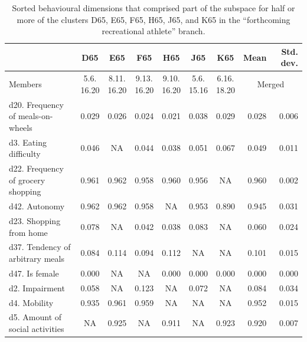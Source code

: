 \begin{table}[ht]
\centering\scriptsize
\setlength\tabcolsep{2pt} %
\renewcommand{\arraystretch}{1.0} %
\caption{Sorted behavioural dimensions that comprised part of the subspace for half or more of the clusters  D65, E65, F65, H65, J65, and K65 in the ``forthcoming recreational athlete'' branch.}
\label{tab:extractathlete}%
\begin{tabular}{lccccccrr}
& D65 & E65 & F65 & H65 & J65 & K65 & \multicolumn{1}{|r}{Mean} & \multicolumn{1}{r}{Std. dev.} \\\toprule
Members & \shortstack{5.6.\\16.20} & \shortstack{8.11.\\16.20} & \shortstack{9.13.\\16.20} & \shortstack{9.10.\\16.20} & \shortstack{5.6.\\15.16} & \shortstack{6.16.\\18.20} & \multicolumn{2}{c}{Merged} \\\toprule
d20. Frequency of meals-on-wheels & 0.029 & 0.026 & 0.024 & 0.021 & 0.038 & 0.029 & \multicolumn{1}{|r}{0.028} & 0.006 \\
d3. Eating difficulty & 0.046 & NA & 0.044 & 0.038 & 0.051 & 0.067 & \multicolumn{1}{|r}{0.049} & 0.011 \\
d22. Frequency of grocery shopping & 0.961 & 0.962 & 0.958 & 0.960 & 0.956 & NA & \multicolumn{1}{|r}{0.960} & 0.002 \\
d42. Autonomy & 0.962 & 0.962 & 0.958 & NA & 0.953 & 0.890 & \multicolumn{1}{|r}{0.945} & 0.031 \\
d23. Shopping from home & 0.078 & NA & 0.042 & 0.038 & 0.083 & NA & \multicolumn{1}{|r}{0.060} & 0.024 \\
d37. Tendency of arbitrary meals & 0.084 & 0.114 & 0.094 & 0.112 & NA & NA & \multicolumn{1}{|r}{0.101} & 0.015 \\
d47. Is female & 0.000 & NA & NA & 0.000 & 0.000 & 0.000 & \multicolumn{1}{|r}{0.000} & 0.000 \\
d2. Impairment & 0.058 & NA & 0.123 & NA & 0.072 & NA & \multicolumn{1}{|r}{0.084} & 0.034 \\
d4. Mobility & 0.935 & 0.961 & 0.959 & NA & NA & NA & \multicolumn{1}{|r}{0.952} & 0.015 \\
d5. Amount of social activities & NA & 0.925 & NA & 0.911 & NA & 0.923 & \multicolumn{1}{|r}{0.920} & 0.007 \\

\end{tabular}
\end{table}
